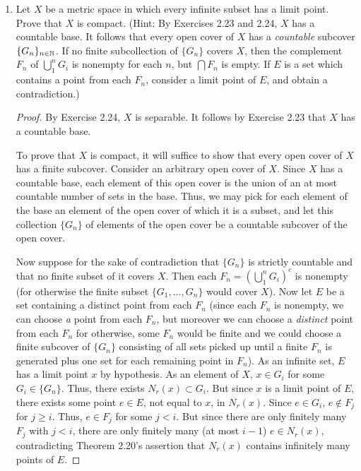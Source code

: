 \documentclass[../psets.tex]{subfiles}
\begin{document}
\begin{enumerate}[label={\textbf{\arabic*.}}]
\begin{proof}
    \end{proof}
    \item Let $X$ be a metric space in which every infinite subset has a limit point. Prove that $X$ is compact. (Hint: By Exercises 2.23 and 2.24, $X$ has a countable base. It follows that every open cover of $X$ has a \emph{countable} subcover $\{G_n\}_{n\in\mathbb{N}}$. If no finite subcollection of $\{G_n\}$ covers $X$, then the complement $F_n$ of $\bigcup_1^nG_i$ is nonempty for each $n$, but $\bigcap F_n$ is empty. If $E$ is a set which contains a point from each $F_n$, consider a limit point of $E$, and obtain a contradiction.)
    \begin{proof}
        By Exercise 2.24, $X$ is separable. It follows by Exercise 2.23 that $X$ has a countable base.\par
        To prove that $X$ is compact, it will suffice to show that every open cover of $X$ has a finite subcover. Consider an arbitrary open cover of $X$. Since $X$ has a countable base, each element of this open cover is the union of an at most countable number of sets in the base. Thus, we may pick for each element of the base an element of the open cover of which it is a subset, and let this collection $\{G_n\}$ of elements of the open cover be a countable subcover of the open cover.\par
        Now suppose for the sake of contradiction that $\{G_n\}$ is strictly countable and that no finite subset of it covers $X$. Then each $F_n=(\bigcup_1^nG_i)^c$ is nonempty (for otherwise the finite subset $\{G_1,\dots,G_n\}$ would cover $X$). Now let $E$ be a set containing a distinct point from each $F_n$ (since each $F_n$ is nonempty, we can choose \emph{a} point from each $F_n$, but moreover we can choose a \emph{distinct} point from each $F_n$ for otherwise, some $F_n$ would be finite and we could choose a finite subcover of $\{G_n\}$ consisting of all sets picked up until a finite $F_n$ is generated plus one set for each remaining point in $F_n$). As an infinite set, $E$ has a limit point $x$ by hypothesis. As an element of $X$, $x\in G_i$ for some $G_i\in\{G_n\}$. Thus, there exists $N_r(x)\subset G_i$. But since $x$ is a limit point of $E$, there exists some point $e\in E$, not equal to $x$, in $N_r(x)$. Since $e\in G_i$, $e\notin F_j$ for $j\geq i$. Thus, $e\in F_j$ for some $j<i$. But since there are only finitely many $F_j$ with $j<i$, there are only finitely many (at most $i-1$) $e\in N_r(x)$, contradicting Theorem 2.20's assertion that $N_r(x)$ contains infinitely many points of $E$.
    \end{proof}

\end{enumerate}
\end{document}
